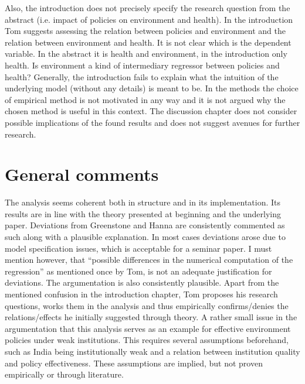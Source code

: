 \documentclass[11pt]{article}
\begin{document}
Also, the introduction does not precisely specify the research question from the abstract (i.e. impact of policies on environment and health). In the introduction Tom suggests assessing the relation between policies and environment and the relation between environment and health. It is not clear which is the dependent variable. In the abstract it is health and environment, in the introduction only health. Is environment a kind of intermediary regressor between policies and health? Generally, the introduction fails to explain what the intuition of the underlying model (without any details) is meant to be. 
In the methods the choice of empirical method is not motivated in any way and it is not argued why the chosen method is useful in this context.
The discussion chapter does not consider possible implications of the found results and does not suggest avenues for further research.


\section{General comments}
The analysis seems coherent both in structure and in its implementation. Its results are in line with the theory presented at beginning and the underlying paper. Deviations from Greenstone and Hanna are consistently commented as such along with a plausible explanation. In most cases deviations arose due to model specification issues, which is acceptable for a seminar paper. I must mention however, that “possible differences in the numerical computation of the regression” as mentioned once by Tom, is not an adequate justification for deviations.
\newline The argumentation is also consistently plausible. Apart from the mentioned confusion in the introduction chapter, Tom proposes his research questions, works them in the analysis and thus empirically confirms/denies the relations/effects he initially suggested through theory. A rather small issue in the argumentation that this analysis serves as an example for effective environment policies under weak institutions. This requires several assumptions beforehand, such as India being institutionally weak and a relation between institution quality and policy effectiveness. These assumptions are implied, but not proven empirically or through literature.

\end{document}
